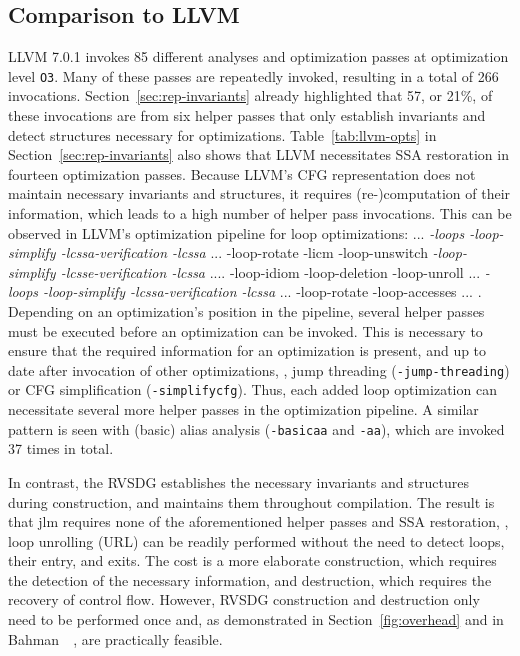\subsection{Comparison to LLVM}\label{sec:llvm-comparison}

LLVM 7.0.1 invokes 85 different analyses and optimization passes at optimization level \texttt{O3}.
Many of these passes are repeatedly invoked, resulting in a total of 266 invocations.
Section~\ref{sec:rep-invariants} already highlighted that 57, or 21\%, of these invocations are
from six helper passes that only establish invariants and detect structures necessary for
optimizations. Table~\ref{tab:llvm-opts} in Section~\ref{sec:rep-invariants} also shows that
LLVM necessitates SSA restoration in
fourteen optimization passes.
Because LLVM's CFG representation does not maintain necessary invariants and structures,
it requires (re-)computation of their information, which leads to a high number of
helper pass invocations.
This can
be observed in LLVM's optimization pipeline for loop optimizations:
... \emph{-loops -loop-simplify -lcssa-verification -lcssa} ... -loop-rotate -licm
-loop-unswitch \emph{-loop-simplify -lcsse-verification -lcssa} .... -loop-idiom -loop-deletion
-loop-unroll ... \emph{-loops -loop-simplify -lcssa-verification -lcssa} ... -loop-rotate
-loop-accesses ... . Depending on an optimization's position in the pipeline, several
helper passes must be executed before an optimization can be invoked. This is necessary to ensure
that the required information for an optimization is present, and up to date after 
invocation of other optimizations, \eg, jump threading (\texttt{-jump-threading}) or
CFG simplification (\texttt{-simplifycfg}). Thus, each added loop optimization
can necessitate several more helper passes in the optimization pipeline. A
similar pattern is seen with (basic) alias analysis (\texttt{-basicaa} and \texttt{-aa}),
which are invoked 37 times in total.

In contrast, the RVSDG establishes the necessary invariants and structures during construction,
and maintains them throughout compilation. The result is that jlm requires none of the
aforementioned helper passes and SSA restoration, \eg,
loop unrolling (URL) can be readily performed without the need to detect loops, their entry,
and exits. The cost is a more elaborate construction, which requires the
detection of the necessary information, and destruction, which requires the recovery
of control flow. However, RVSDG construction and destruction only need to be performed once
and, as demonstrated in Section~\ref{fig:overhead} and in Bahman~\etal~\cite{Bahmann15}, are
practically feasible.


